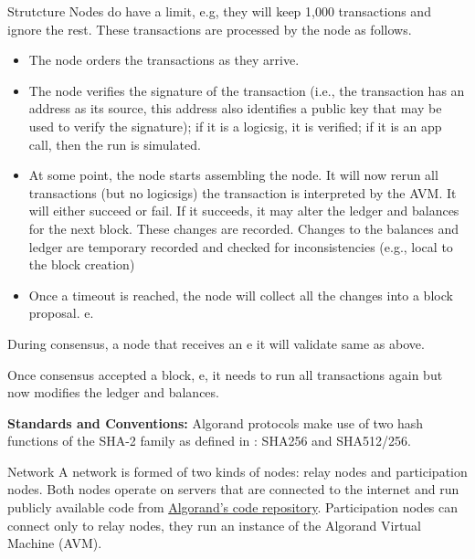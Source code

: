 \documentclass[10pt,a4paper]{article}
\begin{document}
\begin{section}{Strutcture}
Nodes do have a limit, e.g, they will
keep 1,000 transactions and ignore the rest.
These transactions are processed by the node as follows.
\begin{itemize}
    \item The node orders the transactions as they arrive.
    \item The node verifies the signature of the transaction (i.e., the transaction has an 
    address as its source, this address also identifies a public key that may be used to 
    verify the signature); if it is a logicsig, it is verified; if it is an app call, then
    the run is simulated.
    \item At some point, the node starts assembling the node. It will now rerun all transactions
    (but no logicsigs) the transaction is interpreted by the AVM. It will either succeed or
    fail. If it succeeds, it may alter the ledger and balances for the next block. These 
    changes are recorded. Changes to the balances and ledger are temporary recorded and
    checked for inconsistencies (e.g., local to the block creation)
    \item Once a timeout is reached, the node will collect all the changes into a block 
    proposal. e.
\end{itemize}

During consensus, a node that receives an e it will validate same as above.

Once consensus accepted a block, e, it needs to run all transactions again
but now modifies the ledger and balances. 


{\bf Standards and Conventions:}
Algorand protocols make use of two hash functions of the SHA-2 family
as defined in \cite{NIST.FIPS.180-4}: SHA256 and SHA512/256.

    
\begin{subsection}{Network}
A network is formed of two kinds of nodes: {\sf relay nodes}
and {\sf participation nodes}. 
Both nodes operate on servers that are connected to the internet and run publicly
available code from \href{https://github.com/algorand/go-algorand}{Algorand's code repository}.
Participation nodes can connect only to relay nodes, they run an instance
of the Algorand Virtual Machine (AVM).


\end{subsection}
\end{section}
\end{document}
